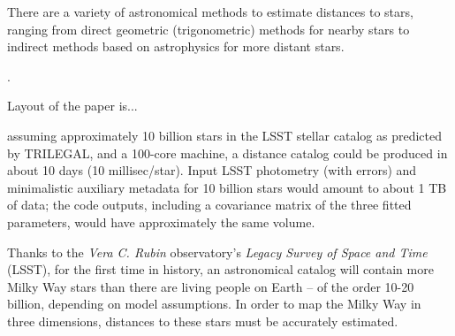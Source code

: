 
There are a variety of astronomical methods to estimate distances to stars, ranging from direct geometric (trigonometric) methods for nearby stars to indirect methods based on astrophysics for more distant stars. 

.

Layout of the paper is...




 assuming approximately 10 billion stars in the LSST stellar catalog as predicted by TRILEGAL, and a 100-core machine, a distance catalog could be produced in about 10 days (10 millisec/star). Input LSST photometry (with errors) and minimalistic auxiliary metadata  for 10 billion stars would amount to about 1 TB of data; the code outputs, including a covariance matrix of the three fitted parameters, would have approximately the same volume.


 

 
 Thanks to the \textit{Vera C. Rubin} observatory's \textit{Legacy Survey of Space and Time} (LSST), for the first time in history, an astronomical catalog will contain more Milky Way stars than there are living people on Earth -- of the order 10-20 billion, depending on model assumptions. In order to map the Milky Way in three dimensions, distances to these stars must be accurately  estimated.





 